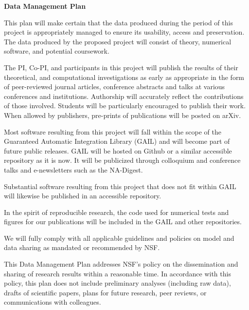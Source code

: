 \documentclass[11pt]{NSFamsart}
\begin{document}

\centerline{\textbf{\Large Data Management Plan}}

\bigskip



This plan will make certain that the data produced during the period of this project is appropriately managed to ensure its usability, access and preservation.  The data produced by the proposed project will consist of theory, numerical software, and potential coursework. 

The PI, Co-PI, and participants in this project will publish the results of their theoretical, and 
computational investigations as early as appropriate in the form of peer-reviewed journal articles, 
conference abstracts and talks at various conferences and institutions. Authorship will accurately 
reflect the contributions of those involved.  Students will be particularly encouraged to publish their 
work. When allowed by publishers, pre-prints of publications will be posted on arXiv.

Most software resulting from this project will fall within the scope of the Guaranteed Automatic 
Integration Library (GAIL) and will become part of future public releases.  GAIL will be hosted on 
Github or a similar accessible repository as it is now.  It will be publicized through colloquium and 
conference talks and e-newsletters such as the NA-Digest.

Substantial software resulting from this project that does not fit within GAIL will likewise be 
published in an accessible repository.

In the spirit of reproducible research, the code used for numerical tests and figures for our 
publications will be included in the GAIL and other repositories.

We will fully comply with all applicable guidelines and policies on model and data sharing as mandated or recommended by NSF.

This Data Management Plan addresses NSF’s policy on the dissemination and sharing of research results within a reasonable time.  In accordance with this policy, this plan does not include preliminary analyses (including raw data), drafts of scientific papers, plans for future research, peer reviews, or communications with colleagues. 
\end{document}
